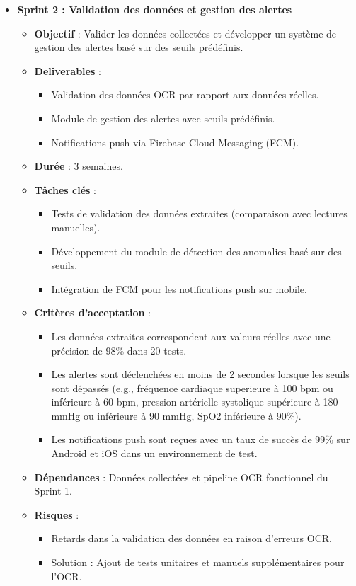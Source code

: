 \begin{itemize}
    \item \textbf{Sprint 2 : Validation des données et gestion des alertes}
    \begin{itemize}
        \item \textbf{Objectif} : Valider les données collectées et développer un système de gestion des alertes basé sur des seuils prédéfinis.
        \item \textbf{Deliverables} :
            \begin{itemize}
                \item Validation des données OCR par rapport aux données réelles.
                \item Module de gestion des alertes avec seuils prédéfinis.
                \item Notifications push via Firebase Cloud Messaging (FCM).
            \end{itemize}
        \item \textbf{Durée} : 3 semaines.
        \item \textbf{Tâches clés} :
            \begin{itemize}
                \item Tests de validation des données extraites (comparaison avec lectures manuelles).
                \item Développement du module de détection des anomalies basé sur des seuils.
                \item Intégration de FCM pour les notifications push sur mobile.
            \end{itemize}
        \item \textbf{Critères d'acceptation} :
            \begin{itemize}
                \item Les données extraites correspondent aux valeurs réelles avec une précision de 98\% dans 20 tests.
                \item Les alertes sont déclenchées en moins de 2 secondes lorsque les seuils sont dépassés (e.g., fréquence cardiaque superieure à 100 bpm ou inférieure à 60 bpm, pression artérielle systolique supérieure à 180 mmHg ou inférieure à 90 mmHg, SpO2 inférieure à 90\%).
                \item Les notifications push sont reçues avec un taux de succès de 99\% sur Android et iOS dans un environnement de test.
            \end{itemize}
        \item \textbf{Dépendances} : Données collectées et pipeline OCR fonctionnel du Sprint 1.
        \item \textbf{Risques} :
            \begin{itemize}
                \item Retards dans la validation des données en raison d'erreurs OCR.
                \item Solution : Ajout de tests unitaires et manuels supplémentaires pour l'OCR.
            \end{itemize}
    \end{itemize}


\end{itemize}
